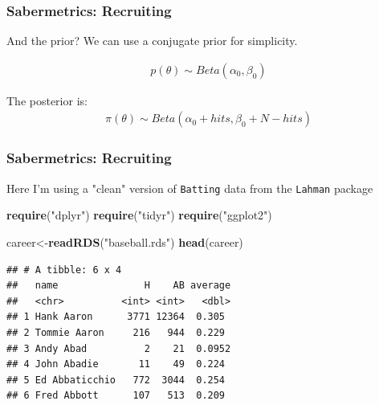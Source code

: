 \documentclass[
  shownotes,
  xcolor={svgnames},
  hyperref={colorlinks,citecolor=DarkBlue,linkcolor=DarkRed,urlcolor=DarkBlue}
  ]{beamer}
\newenvironment{Shaded}{\begin{snugshade}}{\end{snugshade}}
\newcommand{\KeywordTok}[1]{\textcolor[rgb]{0.13,0.29,0.53}{\textbf{#1}}}
\newcommand{\NormalTok}[1]{#1}
\newcommand{\StringTok}[1]{\textcolor[rgb]{0.31,0.60,0.02}{#1}}
\begin{document}
\begin{frame}[fragile]
\frametitle{Sabermetrics: Recruiting}

And the prior? We can use a conjugate prior for simplicity. 

\begin{align}
p(\theta) \sim Beta(\alpha_0,\beta_0)
\end{align}

The posterior is:
\begin{align}
\pi(\theta)\sim Beta(\alpha_0+hits,\beta_0+N-hits)
\end{align}

\end{frame}
\begin{frame}[fragile]
\frametitle{Sabermetrics: Recruiting}

Here I'm using a "clean" version of \texttt{Batting} data from the \texttt{Lahman} package

\small
\begin{Shaded}
\begin{Highlighting}[]
\KeywordTok{require}\NormalTok{(}\StringTok{"dplyr"}\NormalTok{) }
\KeywordTok{require}\NormalTok{(}\StringTok{"tidyr"}\NormalTok{) }
\KeywordTok{require}\NormalTok{(}\StringTok{"ggplot2"}\NormalTok{) }
\end{Highlighting}
\end{Shaded}


\begin{Shaded}
\begin{Highlighting}[]
\NormalTok{career\textless{}{-}}\KeywordTok{readRDS}\NormalTok{(}\StringTok{"baseball.rds"}\NormalTok{)}
\KeywordTok{head}\NormalTok{(career)}
\end{Highlighting}
\end{Shaded}

\begin{small}
\begin{verbatim}
## # A tibble: 6 x 4
##   name               H    AB average
##   <chr>          <int> <int>   <dbl>
## 1 Hank Aaron      3771 12364  0.305 
## 2 Tommie Aaron     216   944  0.229 
## 3 Andy Abad          2    21  0.0952
## 4 John Abadie       11    49  0.224 
## 5 Ed Abbaticchio   772  3044  0.254 
## 6 Fred Abbott      107   513  0.209
\end{verbatim}
\end{small}

\end{frame}
\end{document}
